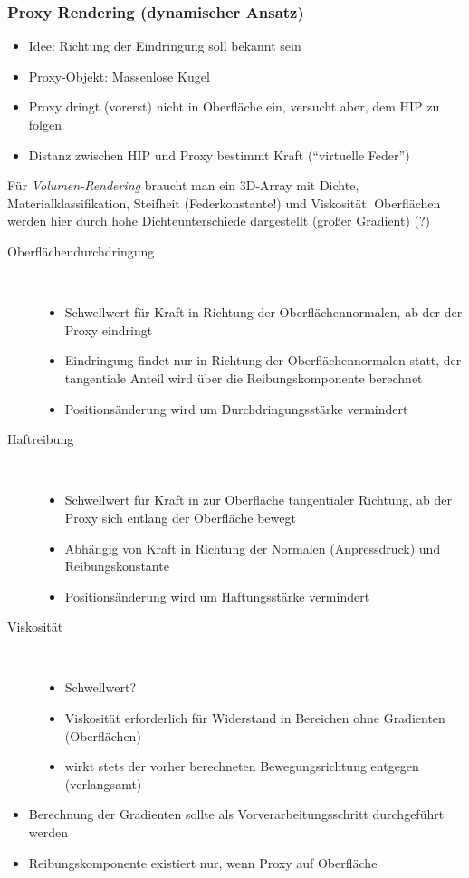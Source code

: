 \documentclass[a4paper, 12pt]{article}
\begin{document}
\subsubsection*{Proxy Rendering (dynamischer Ansatz)}
\begin{itemize}
  \item Idee: Richtung der Eindringung soll bekannt sein
  \item Proxy-Objekt: Massenlose Kugel
  \item Proxy dringt (vorerst) nicht in Oberfläche ein, versucht aber, dem HIP zu folgen
  \item Distanz zwischen HIP und Proxy bestimmt Kraft (``virtuelle Feder'')
\end{itemize}
Für \emph{Volumen-Rendering} braucht man ein 3D-Array mit Dichte, Materialklassifikation, Steifheit (Federkonstante!) und Viskosität. Oberflächen werden hier durch hohe Dichteunterschiede dargestellt (großer Gradient) (?)
\begin{description}
  \item[Oberflächendurchdringung]~
    \begin{itemize}
      \item Schwellwert für Kraft in Richtung der Oberflächennormalen, ab der der Proxy eindringt
      \item Eindringung findet nur in Richtung der Oberflächennormalen statt, der tangentiale Anteil wird über die Reibungskomponente berechnet
      \item Positionsänderung wird um Durchdringungsstärke vermindert
    \end{itemize}
  \item[Haftreibung]~
    \begin{itemize}
      \item Schwellwert für Kraft in zur Oberfläche tangentialer Richtung, ab der Proxy sich entlang der Oberfläche bewegt
      \item Abhängig von Kraft in Richtung der Normalen (Anpressdruck) und Reibungskonstante
      \item Positionsänderung wird um Haftungsstärke vermindert
    \end{itemize}
  \item[Viskosität]~
    \begin{itemize}
      \item Schwellwert?
      \item Viskosität erforderlich für Widerstand in Bereichen ohne Gradienten (Oberflächen)
      \item wirkt stets der vorher berechneten Bewegungsrichtung entgegen (verlangsamt)
    \end{itemize}
\end{description}
\begin{itemize}
  \renewcommand{\labelitemi}{\Large{!}}%
  \item Berechnung der Gradienten sollte als Vorverarbeitungsschritt durchgeführt werden
  \item Reibungskomponente existiert nur, wenn Proxy auf Oberfläche
\end{itemize}
\end{document}
